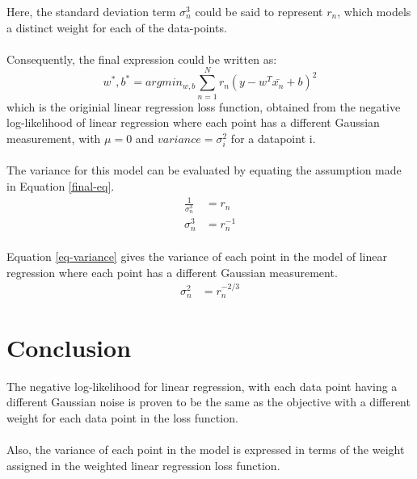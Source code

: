 \documentclass[a4paper]{article}
\begin{document}
Here, the standard deviation term $\sigma_n^3$ could be said to represent $r_n$, which models a distinct weight for each of the data-points.
\\
\\
Consequently, the final expression could be written as:\\
\begin{equation}
\label{final-eq}
	w^*, b^* = argmin_{w,b} \sum_{n=1}^{N} r_n (y - w^T\bar{x_n} + b)^2
\end{equation}
which is the originial linear regression loss function, obtained from the negative log-likelihood of linear regression where each point has a different Gaussian measurement, with $\mu = 0$ and $variance = \sigma_i^2$ for a datapoint i.
\\
\\
The variance for this model can be evaluated by equating the assumption made in Equation \ref{final-eq}.
\begin{align*}
	\frac{1}{\sigma_n^3} &= r_n\\
	\sigma_n^3 &= r_n^{-1}
\end{align*}
\\
Equation \ref{eq-variance} gives the variance of each point in the model of linear regression where each point has a different Gaussian measurement.
\begin{align}
\label{eq-variance}
	\sigma_n^2 &= r_n^{-2/3}
\end{align}


\section{Conclusion}
The negative log-likelihood for linear regression, with each data point having a different Gaussian noise is proven to be the same as the objective with a different weight for each data point in the loss function.\\
\\
Also, the variance of each point in the model is expressed in terms of the weight assigned in the weighted linear regression loss function.
\end{document}
